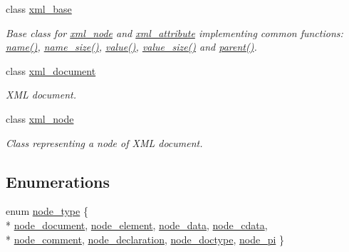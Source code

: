 \begin{DoxyCompactItemize}
class \hyperlink{classrapidxml_1_1xml__base}{xml\+\_\+base}
\begin{DoxyCompactList}\small\item\em Base class for \hyperlink{classrapidxml_1_1xml__node}{xml\+\_\+node} and \hyperlink{classrapidxml_1_1xml__attribute}{xml\+\_\+attribute} implementing common functions\+: \hyperlink{classrapidxml_1_1xml__base_a9a09739310469995db078ebd0da3ed45}{name()}, \hyperlink{classrapidxml_1_1xml__base_a7e7f98b3d01e1eab8dc1ca69aad9af84}{name\+\_\+size()}, \hyperlink{classrapidxml_1_1xml__base_adcdaccff61c665f039d9344e447b7445}{value()}, \hyperlink{classrapidxml_1_1xml__base_a9fcf201ed0915ac18dd43b0b5dcfaf32}{value\+\_\+size()} and \hyperlink{classrapidxml_1_1xml__base_a7f31ae930f93852830234db1ae59c4c4}{parent()}. \end{DoxyCompactList}\item 
class \hyperlink{classrapidxml_1_1xml__document}{xml\+\_\+document}
\begin{DoxyCompactList}\small\item\em X\+M\+L document. \end{DoxyCompactList}\item 
class \hyperlink{classrapidxml_1_1xml__node}{xml\+\_\+node}
\begin{DoxyCompactList}\small\item\em Class representing a node of X\+M\+L document. \end{DoxyCompactList}\end{DoxyCompactItemize}
\subsection*{Enumerations}
\begin{DoxyCompactItemize}
\item 
enum \hyperlink{namespacerapidxml_abb456db38f7efb746c4330eed6072a7c}{node\+\_\+type} \{ \\*
\hyperlink{namespacerapidxml_abb456db38f7efb746c4330eed6072a7ca4023b6a1c7059fd8fbec2112d5c35424}{node\+\_\+document}, 
\hyperlink{namespacerapidxml_abb456db38f7efb746c4330eed6072a7ca89cbeb4d28046326e4ee953d3c4047ff}{node\+\_\+element}, 
\hyperlink{namespacerapidxml_abb456db38f7efb746c4330eed6072a7ca9d669d8e1f4ba9c7eeada4c14a11ad1d}{node\+\_\+data}, 
\hyperlink{namespacerapidxml_abb456db38f7efb746c4330eed6072a7caccf0b363d3876a3f83ff9b1bcdaaa536}{node\+\_\+cdata}, 
\\*
\hyperlink{namespacerapidxml_abb456db38f7efb746c4330eed6072a7ca1a695e1384ec3bd4df3eff65ec609a96}{node\+\_\+comment}, 
\hyperlink{namespacerapidxml_abb456db38f7efb746c4330eed6072a7cafe4ca44261e5fbedf0eab43131751212}{node\+\_\+declaration}, 
\hyperlink{namespacerapidxml_abb456db38f7efb746c4330eed6072a7cadf5002f2efabe231bed01d16f08f832c}{node\+\_\+doctype}, 
\hyperlink{namespacerapidxml_abb456db38f7efb746c4330eed6072a7caeb73b472e77347b9aa89525f16493b87}{node\+\_\+pi}
 \}
\end{DoxyCompactItemize}
